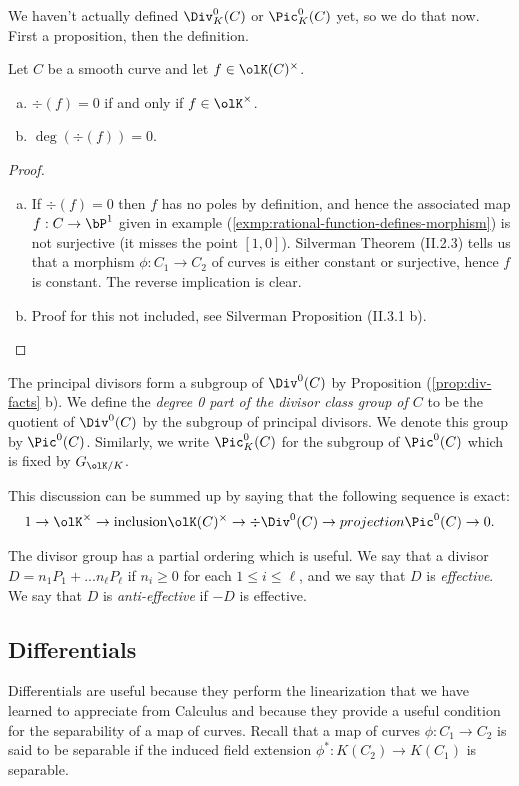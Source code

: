 We haven't actually defined $\Div^0_K(C)$ or $\Pic^0_K(C)$ yet, so we do that now. First a proposition, then the definition.
\begin{prop}\label{prop:div-facts}
	Let $C$ be a smooth curve and let $f \in \olK(C)^\times$.
	\begin{enumerate}[(a)]
		\item $\div(f) = 0$ if and only if $f \in \olK^\times$.
		\item $\deg(\div(f)) = 0$.
	\end{enumerate}
\end{prop}
\begin{proof}$ $
	\begin{enumerate}[(a)]
		\item If $\div(f) = 0$ then $f$ has no poles by definition, and hence the associated map $f:C\to \bP^1$ given in example (\ref{exmp:rational-function-defines-morphism}) is not surjective (it misses the point $[1,0]$). Silverman Theorem (II.2.3) tells us that a morphism $\phi:C_1\to C_2$ of curves is either constant or surjective, hence $f$ is constant. The reverse implication is clear.
		\item Proof for this not included, see Silverman Proposition (II.3.1 b).
	\end{enumerate}
\end{proof}
\begin{defn}\label{defn:degree-0-part-of-divisor}
	The principal divisors form a subgroup of $\Div^0(C)$ by Proposition (\ref{prop:div-facts} b). We define the  \emph{degree 0 part of the divisor class group of $C$} to be the quotient of $\Div^0(C)$ by the subgroup of principal divisors. We denote this group by $\Pic^0(C)$. Similarly, we write $\Pic^0_K(C)$ for the subgroup of $\Pic^0(C)$ which is fixed by $G_{\olK/K}$.
\end{defn}
This discussion can be summed up by saying that the following sequence is exact:
\begin{align*}
	1 \to \olK^\times \to{\text{inclusion}} \olK(C)^\times \to{\div} \Div^0(C) \to{projection} \Pic^0(C) \to 0.
\end{align*}

The divisor group has a partial ordering which is useful. We say that a divisor  $D = n_1P_1+...n_\ell P_\ell$ if $n_i \geq 0$ for each $1\leq i\leq \ell$, and we say that $D$ is \emph{effective}. We say that $D$ is \emph{anti-effective} if $-D$ is effective.

\subsection{Differentials}
Differentials are useful because they perform the linearization that we have learned to appreciate from Calculus and because they provide a useful condition for the separability of a map of curves. Recall that a map of curves $\phi:C_1\to C_2$ is said to be separable if the induced field extension $\phi^*:K(C_2)\to K(C_1)$ is separable.

